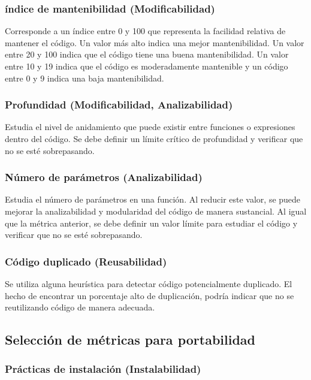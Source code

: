 \subsubsection{índice de mantenibilidad (Modificabilidad)}

Corresponde a un índice entre 0 y 100 que representa la facilidad relativa
de mantener el código. Un valor más alto indica una mejor mantenibilidad. Un valor entre 20 y 100
indica que el código tiene una buena mantenibilidad. Un valor entre 10 y 19 indica que el código es
moderadamente mantenible y un código entre 0 y 9 indica una baja mantenibilidad.

\subsubsection{Profundidad (Modificabilidad, Analizabilidad)}
Estudia el nivel de anidamiento que puede existir entre funciones o expresiones dentro del código.
Se debe definir un límite crítico de profundidad y verificar que no se esté sobrepasando.

\subsubsection{Número de parámetros (Analizabilidad)}
Estudia el número de parámetros en una función.
Al reducir este valor, se puede mejorar la analizabilidad y modularidad del código de manera sustancial.
Al igual que la métrica anterior, se debe definir un valor límite para estudiar el código y verificar que
no se esté sobrepasando.

\subsubsection{Código duplicado (Reusabilidad)}

Se utiliza alguna heurística para detectar código potencialmente duplicado.
El hecho de encontrar un porcentaje alto de duplicación, podría indicar que no se reutilizando
código de manera adecuada.

\subsection{Selección de métricas para portabilidad}

\subsubsection{Prácticas de instalación (Instalabilidad)}


